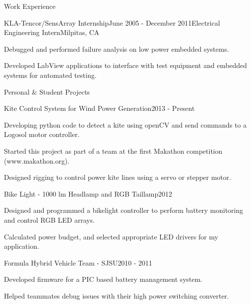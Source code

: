 \documentclass{resume} %
\begin{document}
\begin{rSection}{Work Experience}
\pagebreak[2]
\begin{rSubsection}{KLA-Tencor/SensArray Internship}{June 2005 - December 2011}{Electrical Engineering Intern}{Milpitas, CA}
\item Debugged and performed failure analysis on low power embedded systems. 
\item Developed LabView applications to interface with test equipment and embedded systems for automated testing.
\end{rSubsection}
\end{rSection}

\pagebreak[3]
\begin{rSection}{Personal \& Student Projects}

\vspace{-0.5em}
\begin{rProject}{Kite Control System for Wind Power Generation}{2013 - Present}
\item Developing python code to detect a kite using openCV and send commands to a Logosol motor controller.
\item Started this project as part of a team at the first Makathon competition (www.makathon.org).
\item Designed rigging to control power kite lines using a servo or stepper motor.
\end{rProject}

\vspace{-0.5em}
\begin{rProject}{Bike Light - 1000 lm Headlamp and RGB Taillamp}{2012}
\item Designed and programmed a bikelight controller to perform battery monitoring and control RGB LED arrays.
\item Calculated power budget, and selected appropriate LED drivers for my application.
\end{rProject}
\vspace{-0.5em}

\begin{rProject}{Formula Hybrid Vehicle Team - SJSU}{2010 - 2011}
\item Developed firmware for a PIC based battery management system.
\item Helped teammates debug issues with their high power switching converter.
\end{rProject}
\end{rSection}
\end{document}
